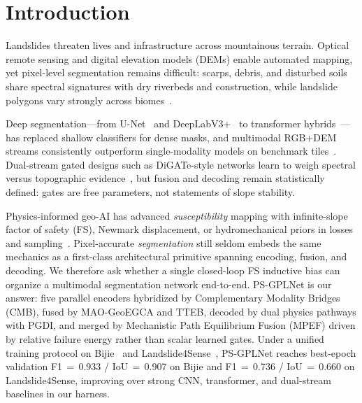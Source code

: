 \section{Introduction}
Landslides threaten lives and infrastructure across mountainous terrain. Optical remote sensing and digital elevation models (DEMs) enable automated mapping, yet pixel-level segmentation remains difficult: scarps, debris, and disturbed soils share spectral signatures with dry riverbeds and construction, while landslide polygons vary strongly across biomes~\cite{ghorbanzadeh2019landslide,ghorbanzadeh2022landslide4sense,ji2020bijie}.

Deep segmentation---from U-Net~\cite{ronneberger2015unet} and DeepLabV3+~\cite{chen2018deeplab} to transformer hybrids~\cite{xie2021segformer,chen2021transunet,dosovitskiy2021vit}---has replaced shallow classifiers for dense masks, and multimodal RGB$+$DEM streams consistently outperform single-modality models on benchmark tiles~\cite{ji2020bijie,ghorbanzadeh2022landslide4sense,mercier2022bifusion}. Dual-stream gated designs such as DiGATe-style networks learn to weigh spectral versus topographic evidence~\cite{islam2024digate}, but fusion and decoding remain statistically defined: gates are free parameters, not statements of slope stability.

Physics-informed geo-AI has advanced \emph{susceptibility} mapping with infinite-slope factor of safety (FS), Newmark displacement, or hydromechanical priors in losses and sampling~\cite{newmark1965effects,skempton1957stability,dahal2024pinn,liu2023physics,maurya2024pgml,karniadakis2021physics,restrepo2022physics}. Pixel-accurate \emph{segmentation} still seldom embeds the same mechanics as a first-class architectural primitive spanning encoding, fusion, and decoding. We therefore ask whether a single closed-loop FS inductive bias can organize a multimodal segmentation network end-to-end. PS-GPLNet is our answer: five parallel encoders hybridized by Complementary Modality Bridges (CMB), fused by MAO-GeoEGCA and TTEB, decoded by dual physics pathways with PGDI, and merged by Mechanistic Path Equilibrium Fusion (MPEF) driven by relative failure energy rather than scalar learned gates. Under a unified training protocol on Bijie~\cite{ji2020bijie} and Landslide4Sense~\cite{ghorbanzadeh2022landslide4sense}, PS-GPLNet reaches best-epoch validation F1\,$=$\,0.933 / IoU\,$=$\,0.907 on Bijie and F1\,$=$\,0.736 / IoU\,$=$\,0.660 on Landslide4Sense, improving over strong CNN, transformer, and dual-stream baselines in our harness.

